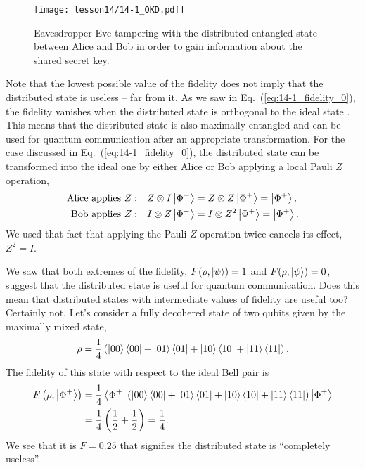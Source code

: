 \begin{figure}[t]
    \centering
    \texttt{[image: lesson14/14-1\_QKD.pdf]}
    \caption[Eavesdropper Eve]{Eavesdropper Eve tampering with the distributed entangled state between Alice and Bob in order to gain information about the shared secret key.}
    \label{fig:14-1_QKD}
\end{figure}

Note that the lowest possible value of the fidelity does not imply that the distributed state is useless -- far from it.
As we saw in Eq.~(\ref{eq:14-1_fidelity_0}), the fidelity vanishes when the distributed state is orthogonal to the ideal state \ket{\Phi^+}.
This means that the distributed state is also maximally entangled and can be used for quantum communication after an appropriate transformation.
For the case discussed in Eq.~(\ref{eq:14-1_fidelity_0}), the distributed state can be transformed into the ideal one by either Alice or Bob applying a local Pauli $Z$ operation,
\begin{align}
    \text{Alice applies } Z: \quad & Z \otimes I \left| \Phi^- \right\rangle = Z \otimes Z \left| \Phi^+ \right\rangle = \left| \Phi^+ \right\rangle, \\
    \text{Bob applies } Z: \quad & I \otimes Z \left| \Phi^- \right\rangle = I \otimes Z^2 \left| \Phi^+ \right\rangle = \left| \Phi^+ \right\rangle.
\end{align}
We used that fact that applying the Pauli $Z$ operation twice cancels its effect, $Z^2 = I$.

We saw that both extremes of the fidelity, $F(\rho,\left| \psi \right\rangle) = 1$ and $F(\rho,\left| \psi \right\rangle) = 0$, suggest that the distributed state is useful for quantum communication.
Does this mean that distributed states with intermediate values of fidelity are useful too?
Certainly not.
Let's consider a fully decohered state of two qubits given by the maximally mixed state,
\begin{equation}
    \rho = \frac{1}{4} \left( \left| 00 \right\rangle\left\langle 00 \right| + \left| 01 \right\rangle\left\langle 01 \right| + \left| 10 \right\rangle\left\langle 10 \right| + \left| 11 \right\rangle\left\langle 11 \right| \right).
\end{equation}
The fidelity of this state with respect to the ideal Bell pair \ket{\Phi^+} is
\begin{align}
    F \left( \rho, \left| \Phi^+ \right\rangle \right) & = \frac{1}{4} \left\langle \Phi^+ \right| \left( \left| 00 \right\rangle\left\langle 00 \right| + \left| 01 \right\rangle\left\langle 01 \right| + \left| 10 \right\rangle\left\langle 10 \right| + \left| 11 \right\rangle\left\langle 11 \right| \right) \left| \Phi^+ \right\rangle \nonumber\\
    & = \frac{1}{4} \left( \frac{1}{2} + \frac{1}{2} \right) = \frac{1}{4}.
\end{align}
We see that it is $F=0.25$ that signifies the distributed state is ``completely useless''.


